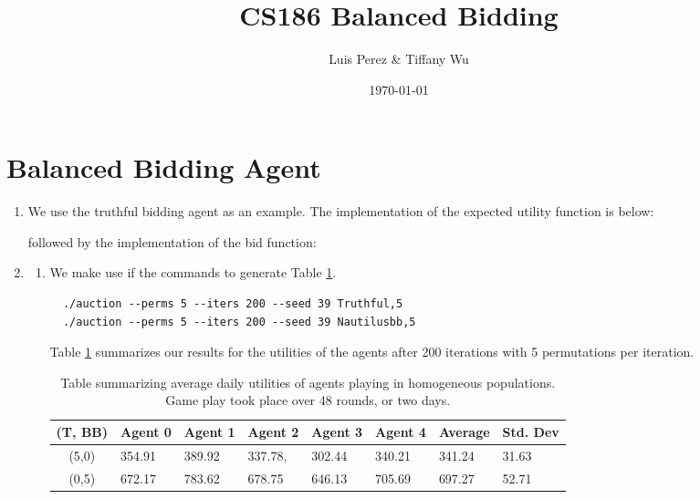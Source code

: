 \documentclass[11pt]{article}
\title{CS186 Balanced Bidding}
\author{Luis Perez \& Tiffany Wu}
\date{\today}
\begin{document}
\maketitle

\section*{Balanced Bidding Agent}
\begin{enumerate}
\item We use the truthful bidding agent as an example. The  implementation of the expected utility function is below:

  
  

  followed by the implementation of the bid function:

  
  
\item 
  \begin{enumerate}
  \item  We make use if the commands to generate Table \ref{tab:bb_tt}.
  \begin{lstlisting}
  ./auction --perms 5 --iters 200 --seed 39 Truthful,5
  ./auction --perms 5 --iters 200 --seed 39 Nautilusbb,5
  \end{lstlisting}
  Table \ref{tab:bb_tt} summarizes our results for the utilities of the agents after 200 iterations with 5 permutations per iteration.
    
    \begin{table}[h!]
      \centering
        \begin{tabular}{clllllll}
        \hline
        (T, BB) & Agent 0 & Agent 1 & Agent 2 & Agent 3 & Agent 4 & Average & Std. Dev     \\ \hline
        (5,0)   & 354.91 & 389.92 & 337.78, & 302.44 & 340.21 & 341.24 & 31.63 \\
        (0,5)   & 672.17   & 783.62  & 678.75  & 646.13  & 705.69 & 697.27 & 52.71 \\ \hline
        \end{tabular}
        \caption{Table summarizing average daily utilities of agents playing in homogeneous populations. Game play took place over 48 rounds, or two days.}
        \label{tab:bb_tt}
      \end{table}


\end{enumerate}
\end{enumerate}
\end{document}
